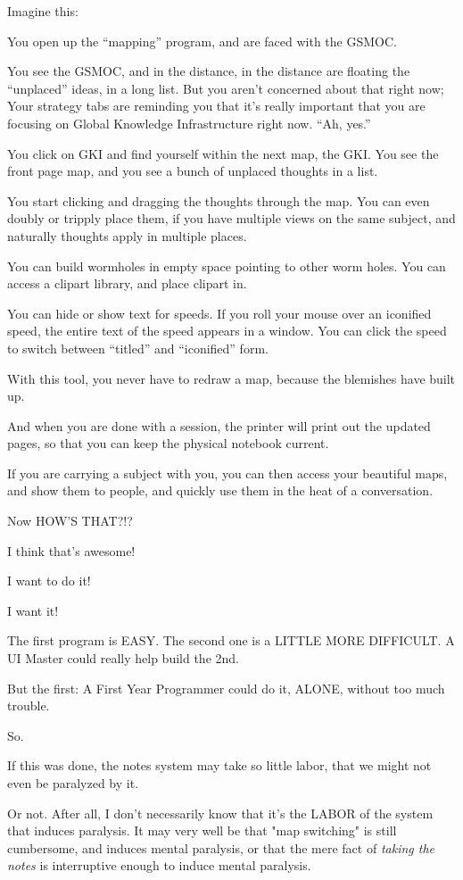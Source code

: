 \documentclass[oneside]{book}
\begin{document}
Imagine this:

You open up the ``mapping'' program, and are faced with the GSMOC.

You see the GSMOC, and in the distance, in the distance are floating
the ``unplaced'' ideas, in a long list. But you aren't concerned about
that right now; Your strategy tabs are reminding you that it's really
important that you are focusing on Global Knowledge Infrastructure
right now. ``Ah, yes.''

You click on GKI and find yourself within the next map, the GKI. You
see the front page map, and you see a bunch of unplaced thoughts in a
list.

You start clicking and dragging the thoughts through the map. You can
even doubly or tripply place them, if you have multiple views on the
same subject, and naturally thoughts apply in multiple places.

You can build wormholes in empty space pointing to other worm
holes. You can access a clipart library, and place clipart in.

You can hide or show text for speeds. If you roll your mouse over an
iconified speed, the entire text of the speed appears in a window.
You can click the speed to switch between ``titled'' and ``iconified''
form.

With this tool, you never have to redraw a map, because the blemishes
have built up.

And when you are done with a session, the printer will print out the
updated pages, so that you can keep the physical notebook current.

If you are carrying a subject with you, you can then access your
beautiful maps, and show them to people, and quickly use them in the
heat of a conversation.

Now HOW'S THAT?!?

I think that's awesome!

I want to do it!

I want it!

The first program is EASY. The second one is a LITTLE MORE
DIFFICULT. A UI Master could really help build the 2nd.

But the first: A First Year Programmer could do it, ALONE, without too
much trouble.

So.

If this was done, the notes system may take so little labor, that we
might not even be paralyzed by it.

Or not. After all, I don't necessarily know that it's the LABOR of the
system that induces paralysis. It may very well be that "map
switching" is still cumbersome, and induces mental paralysis, or that
the mere fact of \emph{taking the notes} is interruptive enough to induce
mental paralysis.
\end{document}
